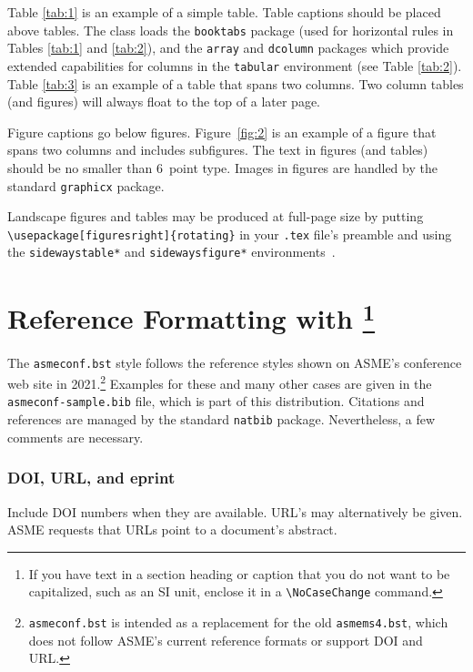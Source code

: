 \documentclass[grid,balance,upint,subscriptcorrection,varvw,mathalfa=cal=euler,spanish,french,greek,russian,vietnamese,colorlinks]{asmeconf}
\begin{document}
Table \ref{tab:1} is an example of a simple table. Table captions should be placed above tables.
The class loads the \texttt{booktabs} package (used for horizontal rules in Tables \ref{tab:1} and \ref{tab:2}), and the \texttt{array} and \texttt{dcolumn} packages which provide extended capabilities for columns in the \texttt{tabular} environment (see Table \ref{tab:2}).  Table \ref{tab:3} is an example of a table that spans two columns. Two column tables (and figures) will always float to the top of a later page.

Figure captions go below figures. Figure~\ref{fig:2} is an example of a figure that spans two columns and includes subfigures. The text in figures (and tables) should be no smaller than 6~point type. Images in figures are handled by the standard \texttt{graphicx} package.

Landscape figures and tables may be produced at full-page size by putting \verb|\usepackage[figuresright]{rotating}| in your \texttt{.tex} file's preamble and using the \texttt{sidewaystable*} and \texttt{sidewaysfigure*} environments~\cite{fairbairns}.



\section{Reference Formatting with \footnote{If you have text in a section heading or caption that you do not want to be capitalized, such as an SI unit, enclose it in a \texttt{\textbackslash NoCaseChange} command.}}\label{sec:references}

The {\upshape\texttt{asmeconf.bst}}   style follows the reference styles shown on ASME's conference web site in  2021.\footnote{\texttt{asmeconf.bst} is intended as a replacement for the old \texttt{asmems4.bst}, which does not follow ASME's current reference formats or support DOI and URL.}
Examples for these and many other cases are given in the \texttt{asmeconf-sample.bib} file, which is part of this distribution. Citations and references are managed by the standard \texttt{natbib} package.  Nevertheless, a few comments are necessary. 


\subsubsection*{DOI, URL, and eprint} Include DOI numbers when they are available.  URL's may alternatively be given. ASME requests that URLs point to a document's abstract.
\end{document}
